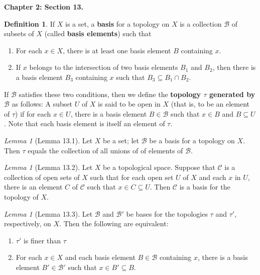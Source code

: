 \documentclass{article}
\theoremstyle{definition}
\newtheorem{definition}{Definition}[section]
\theoremstyle{remark}
\newtheorem{lemma}[theorem]{Lemma}
\begin{document}
    \newpage

    \textbf{Chapter 2: Section 13.}
    \begin{definition}
        If $X$ is a set, a \textbf{basis} for a topology on $X$ is a collection $\mathcal{B}$ of subsets of $X$ 
        (called \textbf{basis elements}) such that
        \begin{enumerate}
            \item For each $x\in X$, there is at least one basis element $B$ containing $x$.
            \item If $x$ belongs to the intersection of two basis elements $B_1$ and $B_2$, then there is a basis element $B_3$
                containing $x$ such that $B_3\subseteq B_1\cap B_2$.
        \end{enumerate}
        If $\mathcal{B}$ satisfies these two conditions, then we define the \textbf{topology $\tau$ generated by} $\mathcal{B}$
        as follows: A subset $U$ of $X$ is said to be open in $X$ (that is, to be an element of $\tau$) if for
        each $x\in U$, there is a basis element $B\in\mathcal{B}$ such that $x\in B$ and $B\subseteq U$. Note that each
        basis element is itself an element of $\tau$.
    \end{definition}

    \begin{lemma}[Lemma 13.1]
        Let $X$ be a set; let $\mathcal{B}$ be a basis for a topology on $X$. Then $\tau$ equals the collection of all unions of
        of elements of $\mathcal{B}$.
    \end{lemma}

    \begin{lemma}[Lemma 13.2]
        Let $X$ be a topological space. Suppose that $\mathcal{C}$ is a collection of open sets of $X$ such that for each open set $U$ 
        of $X$ and each $x$ in $U$, there is an element $C$ of $\mathcal{C}$ such that $x\in C\subseteq U$. Then $\mathcal{C}$ is a
        basis for the topology of $X$.
    \end{lemma}

    \begin{lemma}[Lemma 13.3]
        Let $\mathcal{B}$ and $\mathcal{B}'$ be bases for the topologies $\tau$ and $\tau'$, respectively, on $X$. Then the following
        are equivalent:
        \begin{enumerate}
            \item $\tau'$ is finer than $\tau$
            \item For each $x\in X$ and each basis element $B\in\mathcal{B}$ containing $x$, there is a basis element $B'\in\mathcal{B}'$
                such that $x\in B'\subseteq B$.
        \end{enumerate}
    \end{lemma}
\end{document}
